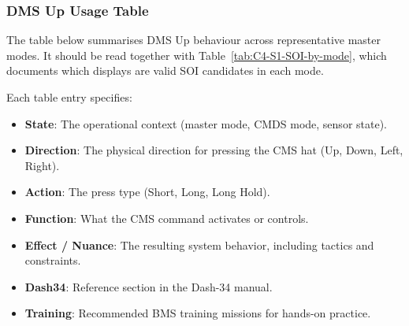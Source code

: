 \documentclass[11pt,a4paper]{article}
\begin{document}
\subsubsection{DMS Up Usage Table}
\label{sec:C4-S2-S2}

The table below summarises DMS Up behaviour across representative master modes. It should be read together with Table~\ref{tab:C4-S1-SOI-by-mode}, which documents which displays are valid SOI candidates in each mode.

Each table entry specifies:

\begin{itemize}
  \item \textbf{State}: The operational context (master mode, CMDS mode, sensor state).
  \item \textbf{Direction}: The physical direction for pressing the CMS hat (Up, Down, Left, Right).
  \item \textbf{Action}: The press type (Short, Long, Long Hold).
  \item \textbf{Function}: What the CMS command activates or controls.
  \item \textbf{Effect / Nuance}: The resulting system behavior, including tactics and constraints.
  \item \textbf{Dash34}: Reference section in the Dash-34 manual.
  \item \textbf{Training}: Recommended BMS training missions for hands-on practice.
\end{itemize}
\end{document}
